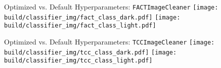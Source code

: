 \begin{frame}{Optimized vs. Default Hyperparameters: \texttt{FACTImageCleaner}}
    {%
    \centering
    \texttt{[image: build/classifier\_img/fact\_class\_dark.pdf]}
    }
    {%
    \centering
    \texttt{[image: build/classifier\_img/fact\_class\_light.pdf]}
    }
\end{frame}

\begin{frame}{Optimized vs. Default Hyperparameters: \texttt{TCCImageCleaner}}
    {%
    \centering
    \texttt{[image: build/classifier\_img/tcc\_class\_dark.pdf]}
    }
    {%
    \centering
    \texttt{[image: build/classifier\_img/tcc\_class\_light.pdf]}
    }
\end{frame}